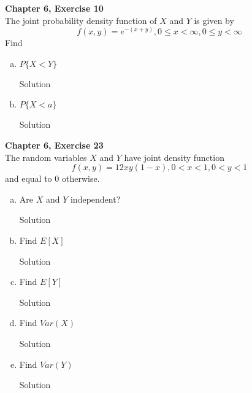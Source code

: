 \documentclass{article}
\begin{document}
\begin{spacing}{1.1}
\newpage
\begin{homeworkProblem}
  {\bf Chapter 6, Exercise 10}\\
  The joint probability density function of $X$ and $Y$ is given by
    \[f( x, y) = e^{-(x + y)}, 0 \le x < \infty, 0 \le y < \infty\]
  Find 
  \begin{enumerate}[(a)]
    \item $P\{ X < Y\}$
      \begin{homeworkSection}{Solution}
        
      \end{homeworkSection}
    \item $P\{ X < a\}$
      \begin{homeworkSection}{Solution}
        
      \end{homeworkSection}
  \end{enumerate}
\end{homeworkProblem}

\newpage
\begin{homeworkProblem}
  {\bf Chapter 6, Exercise 23}\\
  The random variables $X$ and $Y$ have joint density function
  \[f( x, y) = 12 x y (1 - x), 0 < x < 1, 0 < y < 1\]
  and equal to 0 otherwise.
  \begin{enumerate}[(a)]
    \item Are $X$ and $Y$ independent?
      \begin{homeworkSection}{Solution}
        
      \end{homeworkSection}
    \item Find $E[ X]$
      \begin{homeworkSection}{Solution}
        
      \end{homeworkSection}
    \item Find $E[ Y]$
      \begin{homeworkSection}{Solution}
        
      \end{homeworkSection}
    \item Find $Var( X)$
      \begin{homeworkSection}{Solution}
        
      \end{homeworkSection}
    \item Find $Var( Y)$
      \begin{homeworkSection}{Solution}
        

\end{homeworkSection}
\end{enumerate}
\end{homeworkProblem}
\end{spacing}
\end{document}
